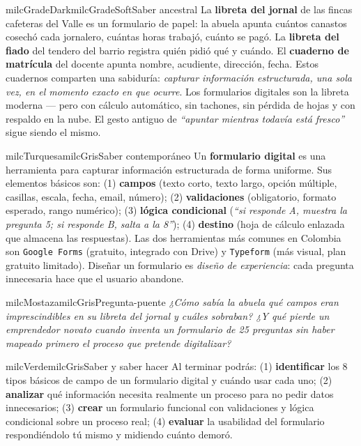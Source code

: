 \documentclass[11pt,letterpaper]{article}
\begin{document}
\begin{softbox}{milcGradeDark}{milcGradeSoft}{Saber ancestral}
La \textbf{libreta del jornal} de las fincas cafeteras del Valle es un formulario de papel: la abuela apunta cuántos canastos cosechó cada jornalero, cuántas horas trabajó, cuánto se pagó. La \textbf{libreta del fiado} del tendero del barrio registra quién pidió qué y cuándo. El \textbf{cuaderno de matrícula} del docente apunta nombre, acudiente, dirección, fecha. Estos cuadernos comparten una sabiduría: \emph{capturar información estructurada, una sola vez, en el momento exacto en que ocurre}. Los formularios digitales son la libreta moderna --- pero con cálculo automático, sin tachones, sin pérdida de hojas y con respaldo en la nube. El gesto antiguo de \emph{``apuntar mientras todavía está fresco''} sigue siendo el mismo.
\end{softbox}

\begin{softbox}{milcTurquesa}{milcGris}{Saber contemporáneo}
Un \textbf{formulario digital} es una herramienta para capturar información estructurada de forma uniforme. Sus elementos básicos son: (1) \textbf{campos} (texto corto, texto largo, opción múltiple, casillas, escala, fecha, email, número); (2) \textbf{validaciones} (obligatorio, formato esperado, rango numérico); (3) \textbf{lógica condicional} (\emph{``si responde A, muestra la pregunta 5; si responde B, salta a la 8''}); (4) \textbf{destino} (hoja de cálculo enlazada que almacena las respuestas). Las dos herramientas más comunes en Colombia son \texttt{Google Forms} (gratuito, integrado con Drive) y \texttt{Typeform} (más visual, plan gratuito limitado). Diseñar un formulario es \emph{diseño de experiencia}: cada pregunta innecesaria hace que el usuario abandone.
\end{softbox}

\begin{softbox}{milcMostaza}{milcGris}{Pregunta-puente}
\textit{¿Cómo sabía la abuela qué campos eran imprescindibles en su libreta del jornal y cuáles sobraban? ¿Y qué pierde un emprendedor novato cuando inventa un formulario de 25 preguntas sin haber mapeado primero el proceso que pretende digitalizar?}
\end{softbox}

\begin{softbox}{milcVerde}{milcGris}{Saber y saber hacer}
Al terminar podrás: (1) \textbf{identificar} los 8 tipos básicos de campo de un formulario digital y cuándo usar cada uno; (2) \textbf{analizar} qué información necesita realmente un proceso para no pedir datos innecesarios; (3) \textbf{crear} un formulario funcional con validaciones y lógica condicional sobre un proceso real; (4) \textbf{evaluar} la usabilidad del formulario respondiéndolo tú mismo y midiendo cuánto demoró.
\end{softbox}
\end{document}
